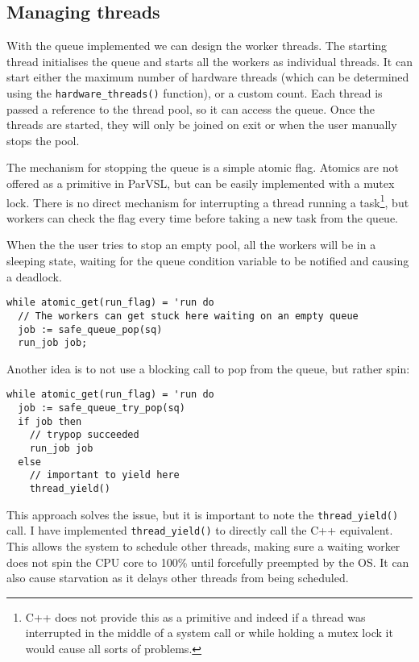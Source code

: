 \subsection{Managing threads}
\label{ssec:managethreads}

With the queue implemented we can design the worker threads. The starting thread
initialises the queue and starts all the workers as individual threads. It can start
either the maximum number of hardware threads (which can be determined using the
\texttt{hardware\_threads()} function), or a custom count. Each thread is passed a reference to
the thread pool, so it can access the queue. Once the threads are started, they will only
be joined on exit or when the user manually stops the pool.

The mechanism for stopping the queue is a simple atomic flag. Atomics are not offered as
a primitive in ParVSL, but can be easily implemented with a mutex lock. There is no direct
mechanism for interrupting a thread running a task\footnote{C++ does not provide this as a
primitive and indeed if a thread was interrupted in the middle of a system call or while
holding a mutex lock it would cause all sorts of problems.}, but workers can check the flag
every time before taking a new task from the queue.

When the the user tries to stop an empty pool, all
the workers will be in a sleeping state, waiting for the queue condition variable to be
notified and causing a deadlock.

\begin{verbatim}
while atomic_get(run_flag) = 'run do
  // The workers can get stuck here waiting on an empty queue
  job := safe_queue_pop(sq)
  run_job job;
\end{verbatim}

Another idea is to not use a blocking call to pop from the queue, but rather spin:
\begin{verbatim}
while atomic_get(run_flag) = 'run do
  job := safe_queue_try_pop(sq)
  if job then
    // trypop succeeded
    run_job job
  else
    // important to yield here
    thread_yield()
\end{verbatim}

This approach solves the issue, but it is important to note the \verb|thread_yield()| call.
I have implemented \verb|thread_yield()| to directly call the C++ equivalent. This allows the
system to schedule other threads, making sure a waiting worker does not spin the CPU
core to 100\% until forcefully preempted by the OS. It can also cause starvation as it
delays other threads from being scheduled.

